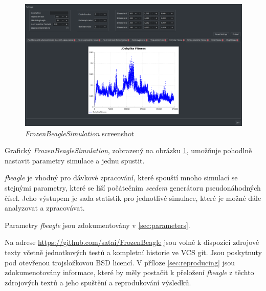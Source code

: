 \begin{figure}[h]
\centering
\includegraphics[totalheight=8cm]{img/Screenshot.pdf}
    \caption{\textit{FrozenBeagleSimulation} screenshot}
\label{fig:FrozenBeagleScreenshot}
\end{figure}

Grafický \textit{FrozenBeagleSimulation}, zobrazený na obrázku \ref{fig:FrozenBeagleScreenshot},
umožňuje pohodlně nastavit parametry simulace a jednu spustit.

\textit{fbeagle} je vhodný pro dávkové zpracování, které spouští mnoho simulací se stejnými parametry, které se liší
počátečním \textit{seedem} generátoru pseudonáhodných čísel. Jeho výstupem je sada statistik pro jednotlivé simulace,
které je možné dále analyzovat a zpracovávat.

Parametry \textit{fbeagle} jsou zdokumentovány v \ref{sec:parameters}.

Na adrese \url {https://github.com/satai/FrozenBeagle} jsou volně k dispozici zdrojové texty včetně jednotkových testů
a kompletní historie ve VCS git. Jsou poskytnuty pod otevřenou trojsložkovou BSD licencí. V příloze \ref{sec:reproducing} jsou
zdokumenotovány informace, které by měly postačit k přeložení \textit{fbeagle} z těchto zdrojových textů
a jeho spuštění a reprodukování výsledků.

